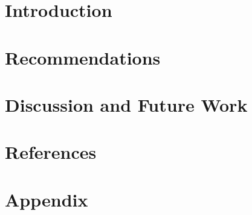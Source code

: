 \documentclass[headsepline,titlepage,twoside,12pt,toc=flat,headings=normal]{scrreprt}
\begin{document}
\iffalse
\begin{table}
%
\end{table}
\begin{table}
%
\end{table}
\begin{table}
%
\end{table}
\begin{table}
%
\end{table}
\begin{table}
%
\end{table}
\begin{table}
\fi

\chapter{Introduction}\label{ch:introduction}
\chapter{Recommendations}\label{ch:introduction}

\chapter{Discussion and Future Work}\label{ch:introduction}

\chapter{References}\label{ch:introduction}



\chapter{Appendix}\label{ch:appendix}
\end{document}
